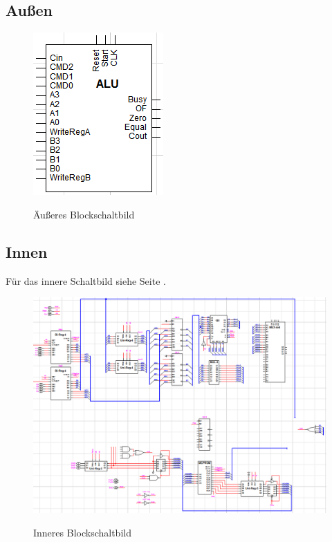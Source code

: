 \documentclass[11pt]{report}
\begin{document}
	\subsection{Außen}
	\begin{figure}[htbp]
		\begin{center}
			\includegraphics[]{aeusseresBlockschaltbild}
			\label{aeusseresBlockschaltbild}
			\caption{Äußeres Blockschaltbild}
		\end{center}
	\end{figure}
	
	\subsection{Innen}
	Für das innere Schaltbild siehe Seite \pageref{inneresBlockschaltbild}.
	\begin{figure}[htbp]
		\begin{center}
			\includegraphics[width=\textwidth]{inneresBlockschaltbild}
			\label{inneresBlockschaltbild}
			\caption{Inneres Blockschaltbild}
		\end{center}
	\end{figure}
	
\end{document}
